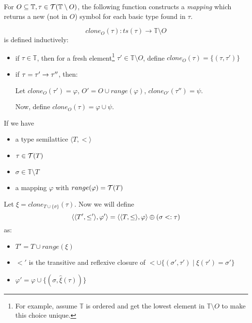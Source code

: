 \documentclass[main.tex]{subfiles}
\begin{document}
\begin{defn}
    For $O \subseteq \mathbb{T}, \tau \in \mathcal{T}( \mathbb{T} \setminus O )$,
    the following function constructs a \emph{mapping} which returns a new (not
    in $O$) symbol for each basic type found in $\tau$.

    \[ clone_O(\tau) : ts(\tau) \rightarrow \mathbb{T} \setminus O \]
    is defined inductively:
    \begin{itemize}
        \item if $\tau \in \mathbb{T}$, then for a fresh element\footnote{
            For example, assume $\mathbb{T}$ is ordered and get the lowest element
            in $\mathbb{T} \setminus O$ to make this choice unique.}
            $\tau' \in \mathbb{T} \setminus O$, define
            $clone_O(\tau) = \{ (\tau, \tau') \}$
        \item if $\tau = \tau' \rightarrow \tau''$, then:

            Let $clone_O(\tau') = \varphi$, $O' = O \cup range(\varphi)$,
            $clone_{O'}(\tau'') = \psi$.

            Now, define $clone_O(\tau) = \varphi \cup \psi$.
    \end{itemize}
\end{defn}


\begin{defn}
    \label{def:subadd}
    If we have
    \begin{itemize}
        \item a type semilattice $\langle T, \less \rangle$
        \item $\tau \in \mathcal{T}( T )$
        \item $\sigma \in \mathbb{T} \setminus T$
        \item a mapping $\varphi$ with $range(\varphi) = \mathcal{T}( T )$
    \end{itemize}
    Let $\xi = clone_{T \cup \{ \sigma \}}(\tau)$.
    Now we will define \[ \langle \langle T', \leq' \rangle, \varphi' \rangle
        = \langle \langle T, \leq \rangle, \varphi \rangle
        \oplus (\sigma <: \tau) \] as:
    \begin{itemize}
        \item $T' = T \cup range(\xi)$
        \item $\less'$ is the transitive and reflexive closure of
            $\less \cup \{ (\sigma', \tau') \mid \xi(\tau') = \sigma' \}$
        \item $\varphi' = \varphi \cup \{ (\sigma, \hat{\xi}(\tau)) \}$
    \end{itemize}
\end{defn}
\end{document}
